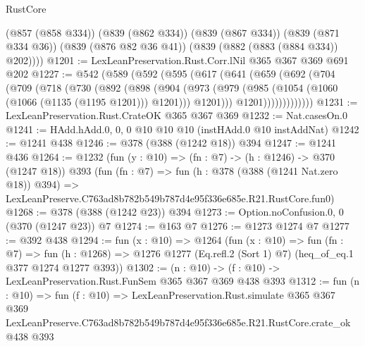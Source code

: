 \begin{lexlean}{RustCore}
\begin{coremodule}
        (@857 (@858 @334))
        (@839 (@862 @334))
        (@839 (@867 @334))
        (@839 (@871 @334 @36))
        (@839 (@876 @82 @36 @41))
        (@839 (@882 (@883 (@884 @334)) @202))))
@1201 := LexLeanPreservation.Rust.Corr.lNil @365 @367 @369 @691 @202
@1227 := @542
    (@589
      (@592
        (@595
          (@617
            (@641
              (@659
                (@692
                  (@704
                    (@709
                      (@718
                        (@730
                          (@892
                            (@898
                              (@904
                                (@973
                                  (@979
                                    (@985 (@1054 (@1060 (@1066 (@1135 (@1195 @1201))) @1201)))
                                    @1201)))
                              @1201)))))))))))))
@1231 := LexLeanPreservation.Rust.CrateOK @365 @367 @369
@1232 := Nat.casesOn.{0}
@1241 := HAdd.hAdd.{0, 0, 0} @10 @10 @10 (instHAdd.{0} @10 instAddNat)
@1242 := @1241 @438
@1246 := @378 (@388 (@1242 @18)) @394
@1247 := @1241 @436
@1264 := @1232
    (fun (y : @10) => (fn : @7) -> (h : @1246) -> @370 (@1247 @18))
    @393
    (fun (fn : @7) =>
    fun (h : @378 (@388 (@1241 Nat.zero @18)) @394) =>
    LexLeanPreserve.C763ad8b782b549b787d4e95f336e685e.R21.RustCore.fun0)
@1268 := @378 (@388 (@1242 @23)) @394
@1273 := Option.noConfusion.{0, 0} (@370 (@1247 @23)) @7
@1274 := @163 @7
@1276 := @1273 @1274 @7
@1277 := @392 @438
@1294 := fun (x : @10) =>
  @1264
    (fun (x : @10) =>
    fun (fn : @7) =>
    fun (h : @1268) => @1276 @1277 (Eq.refl.{2} (Sort 1) @7) (heq_of_eq.{1} @377 @1274 @1277 @393))
@1302 := (n : @10) -> (f : @10) -> LexLeanPreservation.Rust.FunSem @365 @367 @369 @438 @393
@1312 := fun (n : @10) =>
  fun (f : @10) =>
  LexLeanPreservation.Rust.simulate
    @365
    @367
    @369
    LexLeanPreserve.C763ad8b782b549b787d4e95f336e685e.R21.RustCore.crate_ok
    @438
    @393
\end{coremodule}
\end{lexlean}
